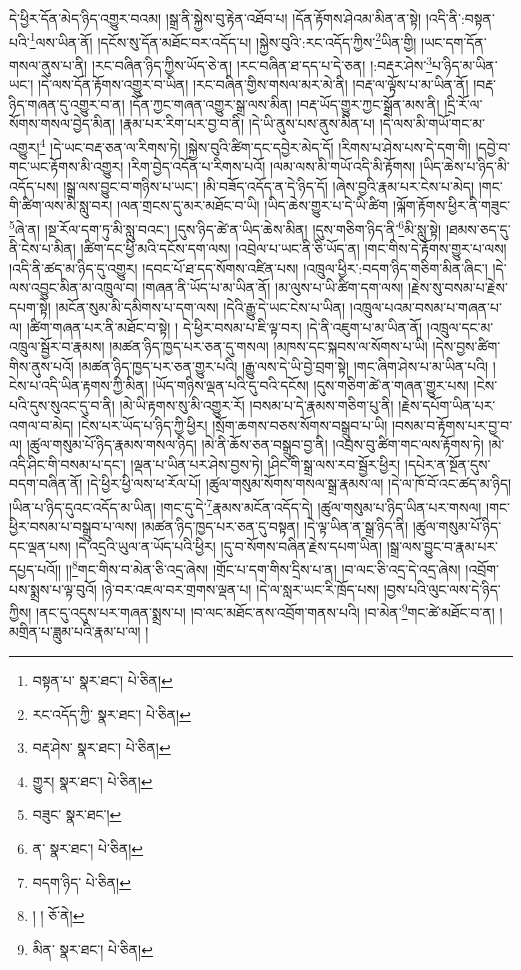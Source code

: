 དེ་ཕྱིར་དོན་མེད་ཉིད་འགྱུར་བའམ། །སྒྲ་ནི་སྐྱེས་བུ་རྟེན་འཐོབ་པ། །དོན་རྟོགས་ཤེའམ་མིན་ན་སྟེ། །འདི་ནི་:བསྟན་པའི་\footnote{བསྟན་པ་  སྣར་ཐང་།  པེ་ཅིན། }ལས་ཡིན་ནོ། །དངོས་སུ་དོན་མཐོང་བར་འདོད་པ། །སྐྱེས་བུའི་:རང་འདོད་ཀྱིས་\footnote{རང་འདོད་ཀྱི་  སྣར་ཐང་།  པེ་ཅིན། }ཡིན་གྱི། །ཡང་དག་དོན་གསལ་ནུས་པ་ནི། །རང་བཞིན་ཉིད་ཀྱིས་ཡོད་ཅེ་ན། །རང་བཞིན་ཐ་དད་པ་དེ་ཅན། །:བརྡར་ཤེས་\footnote{བརྡ་ཤེས་  སྣར་ཐང་།  པེ་ཅིན། }པ་ཉིད་མ་ཡིན་ཡང་། །དེ་ལས་དོན་རྟོགས་འགྱུར་བ་ཡིན། །རང་བཞིན་གྱིས་གསལ་མར་མེ་ནི། །བརྡ་ལ་ལྟོས་པ་མ་ཡིན་ནོ། །བརྡ་ཉིད་གཞན་དུ་འགྱུར་བ་ན། །དོན་ཀྱང་གཞན་འགྱུར་སྒྲ་ལས་མིན། །བརྡ་ཡོད་གྱུར་ཀྱང་སྒྲོན་མས་ནི། །དྲི་རོ་ལ་སོགས་གསལ་བྱེད་མིན། །རྣམ་པར་རིག་པར་བྱ་བ་ནི། །དེ་ཡི་ནུས་པས་ནུས་མིན་པ། །དེ་ལས་མི་གཡོ་གང་མ་འགྱུར།\footnote{གྱུར།  སྣར་ཐང་།  པེ་ཅིན། } །དེ་ཡང་བརྡ་ཅན་ལ་རིགས་ཏེ། །སྐྱེས་བུའི་ཚིག་དང་དབྱེར་མེད་དོ། །རིགས་པ་ཤེས་པས་དེ་དག་གི། །དབྱེ་བ་གང་ཡང་རྟོགས་མི་འགྱུར། །རིག་བྱེད་འདོན་པ་རིགས་པའོ། །ལམ་ལས་མི་གཡོ་འདི་མི་རྟོགས། །ཡིད་ཆེས་པ་ཉིད་མི་འདོད་པས། །སྒྲ་ལས་བྱུང་བ་གཉིས་པ་ཡང་། །མི་བཟོད་འདོད་ན་དེ་ཉིད་དོ། །ཞེས་བྱའི་རྣམ་པར་ངེས་པ་མེད། །གང་གི་ཚིག་ལས་མི་སླུ་བར། །ལན་གྲངས་དུ་མར་མཐོང་བ་ཡི། །ཡིད་ཆེས་གྱུར་པ་དེ་ཡི་ཚིག །ལྐོག་རྟོགས་ཕྱིར་ནི་གཟུང་\footnote{བཟུང་  སྣར་ཐང་། }ཞེ་ན། །སྔ་རོལ་དག་ཏུ་མི་སླུ་བའང་། །དུས་ཉིད་ཚེ་ན་ཡིད་ཆེས་མིན། །དུས་གཅིག་ཉིད་ནི་\footnote{ན་  སྣར་ཐང་།  པེ་ཅིན། }མི་སླུ་སྟེ། །ཐམས་ཅད་དུ་ནི་ངེས་པ་མིན། །ཚིག་དང་ཕྱི་མའི་དངོས་དག་ལས། །འབྲེལ་པ་ཡང་ནི་ཅི་ཡོད་ན། །གང་གིས་དེ་རྟོགས་གྱུར་པ་ལས། །འདི་ནི་ཚད་མ་ཉིད་དུ་འགྱུར། །དབང་པོ་ཐ་དད་སོགས་འཛིན་པས། །འཁྲུལ་ཕྱིར་:བདག་ཉིད་གཅིག་མིན་ཞིང་། །དེ་ལས་འབྱུང་མིན་མ་འཁྲུལ་བ། །གཞན་ནི་ཡོད་པ་མ་ཡིན་ནོ། །མ་ལུས་པ་ཡི་ཚིག་དག་ལས། །རྗེས་སུ་བསམ་པ་རྗེས་དཔག་སྟེ། །མངོན་སུམ་མི་དམིགས་པ་དག་ལས། །དེའི་རྒྱུ་དེ་ཡང་ངེས་པ་ཡིན། །འཁྲུལ་པའམ་བསམ་པ་གཞན་པ་ལ། །ཚིག་གཞན་པར་ནི་མཐོང་བ་སྟེ། །
དེ་ཕྱིར་བསམ་པ་ཇི་ལྟ་བར། །དེ་ནི་འཇུག་པ་མ་ཡིན་ནོ། །འཁྲུལ་དང་མ་འཁྲུལ་སྦྱོར་བ་རྣམས། །མཚན་ཉིད་ཁྱད་པར་ཅན་དུ་གསལ། །མཁས་དང་སྐབས་ལ་སོགས་པ་ཡི། །དེས་བྱས་ཚིག་གིས་ནུས་པའོ། །མཚན་ཉིད་ཁྱད་པར་ཅན་གྱུར་པའི། །རྒྱུ་ལས་དེ་ཡི་བྱེ་བྲག་སྟེ། །གང་ཞིག་ཤེས་པ་མ་ཡིན་པའི། །ངེས་པ་འདི་ཡིན་རྟགས་ཀྱི་མིན། །ཡོད་གཉིས་ལྡན་པའི་དུ་བའི་དངོས། །དུས་གཅིག་ཚེ་ན་གཞན་གྱུར་པས། །ངེས་པའི་དུས་སུའང་དུ་བ་ནི། །མེ་ཡི་རྟགས་སུ་མི་འགྱུར་རོ། །བསམ་པ་དེ་རྣམས་གཅིག་པུ་ནི། །རྗེས་དཔོག་ཡིན་པར་འགལ་བ་མེད། །ངེས་པར་ཡོད་པ་ཉིད་ཀྱི་ཕྱིར། །སྲོག་ཆགས་བཅས་སོགས་བསྒྲུབ་པ་ཡི། །བསམ་བ་རྟོགས་པར་བྱ་བ་ལ། །ཚུལ་གསུམ་པོ་ཉིད་རྣམས་གསལ་ཉིད། །མེ་ནི་ཆོས་ཅན་བསྒྲུབ་བྱ་ནི། །འབྲས་བུ་ཚིག་གང་ལས་རྟོགས་ཏེ། །མེ་འདི་ཤིང་གི་བསམ་པ་དང་། །ལྡན་པ་ཡིན་པར་ཤེས་བྱས་ཏེ། །ཤིང་གི་སྒྲ་ལས་རབ་སྦྱོར་ཕྱིར། །དཔེར་ན་སྔོན་དུས་བདག་བཞིན་ནོ། །དེ་ཕྱིར་ཕྱི་ལས་ཕ་རོལ་པོ། །ཚུལ་གསུམ་སོགས་གསལ་སྒྲ་རྣམས་ལ། །དེ་ལ་ཁོ་བོ་འང་ཚད་མ་ཉིད། །ཡིན་པ་ཉིད་དུའང་འདོད་མ་ཡིན། །གང་དུ་དེ་\footnote{བདག་ཉིད་  པེ་ཅིན། }རྣམས་མངོན་འདོད་དེ། །ཚུལ་གསུམ་པ་ཉིད་ཡིན་པར་གསལ། །གང་ཕྱིར་བསམ་པ་བསྒྲུབ་པ་ལས། །མཚན་ཉིད་ཁྱད་པར་ཅན་དུ་བསྟན། །དེ་ལྟ་ཡིན་ན་སྒྲ་ཉིད་ནི། །ཚུལ་གསུམ་པོ་ཉིད་དང་ལྡན་པས། །དེ་འདྲའི་ཡུལ་ན་ཡོད་པའི་ཕྱིར། །དུ་བ་སོགས་བཞིན་རྗེས་དཔག་ཡིན། །སྒྲ་ལས་བྱུང་བ་རྣམ་པར་དཔྱད་པའོ།། །།\footnote{། །  ཅོ་ནེ། }གང་གིས་བ་མེན་ཅི་འདྲ་ཞེས། །གྲོང་པ་དག་གིས་དྲིས་པ་ན། །བ་ལང་ཅི་འདྲ་དེ་འདྲ་ཞེས། །འབྲོག་པས་སྨྲས་པ་ལྟ་བུའོ། །ཉེ་བར་འཇལ་བར་གྲགས་ལྡན་པ། །དེ་ལ་སླར་ཡང་རི་ཁྲོད་པས། །བྱས་པའི་ལུང་ལས་དེ་ཉིད་ཀྱིས། །ནང་དུ་འདུས་པར་གཞན་སྨྲས་པ། །བ་ལང་མཐོང་ནས་འབྲོག་གནས་པའི། །བ་མེན་\footnote{མིན་  སྣར་ཐང་།  པེ་ཅིན། }གང་ཚེ་མཐོང་བ་ན། །མགྲིན་པ་ཟླུམ་པའི་རྣམ་པ་ལ། །

